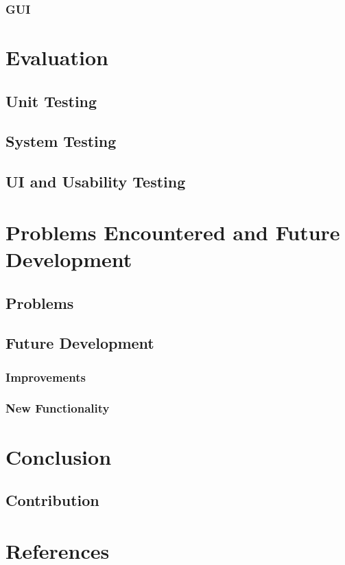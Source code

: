 \documentclass{l4proj}
\begin{document}
\subsection{GUI}

\chapter{Evaluation}

\section{Unit Testing}

\section{System Testing}

\section{UI and Usability Testing}

\chapter{Problems Encountered and Future Development}


\section{Problems}


\section{Future Development}


\subsection{Improvements}


\subsection{New Functionality}


\chapter{Conclusion}


\section{Contribution}

\chapter{References}
\end{document}

